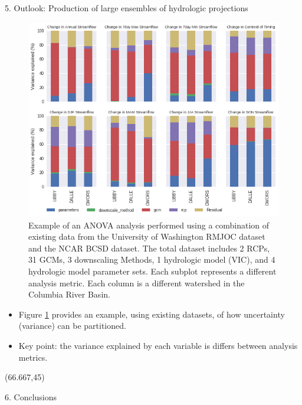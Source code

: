 \documentclass{beamer}
\begin{document}
\begin{frame}{}
\begin{columns}
\begin{column}{.3333\paperwidth}
\begin{textblock}{\textwidth \TPHorizModule}
\begin{block}{5. Outlook: Production of large ensembles of hydrologic projections}
     \begin{figure}
      \center\includegraphics[width=0.75\linewidth]{figures/anova.png}
      \caption{Example of an ANOVA analysis performed using a combination of existing data from the University of Washington RMJOC dataset and the NCAR BCSD dataset. The total dataset includes 2 RCPs, 31 GCMs, 3 downscaling Methods, 1 hydrologic model (VIC), and 4 hydrologic model parameter sets. Each subplot represents a different analysis metric. Each column is a different watershed in the Columbia River Basin.
       \label{fig:anova}}
     \end{figure}

     \begin{itemize}
      \justifying
      \item Figure \ref{fig:anova} provides an example, using existing datasets, of how uncertainty (variance) can be partitioned.
      \item Key point: the variance explained by each variable is differs between analysis metrics.
     \end{itemize}

    \end{block}
   \end{textblock}

   \begin{textblock}{\textwidth \TPHorizModule}(66.667,45)


    \begin{block}{6. Conclusions}

     \begin{shaded}


\end{shaded}
\end{block}
\end{textblock}
\end{column}
\end{columns}
\end{frame}
\end{document}
